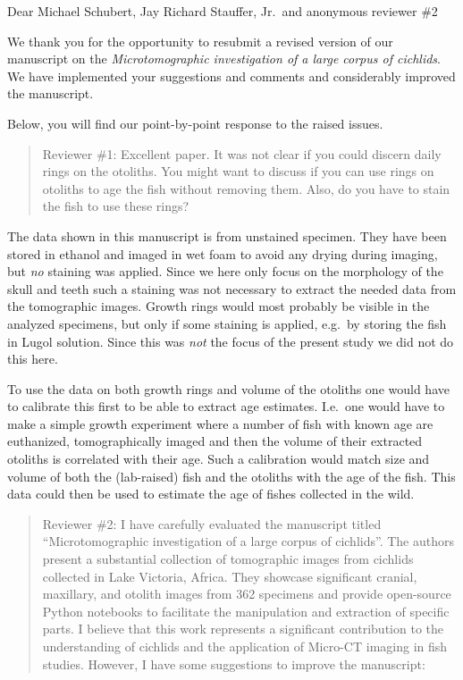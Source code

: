 \documentclass[color,english,personal]{ubletter}
\begin{document}
\begin{letter}{}
\subject{Submission of revised manuscript PONE-D-23-10896}

\opening{Dear Michael Schubert, Jay Richard Stauffer, Jr.\ and anonymous reviewer \#2}

We thank you for the opportunity to resubmit a revised version of our manuscript on the \emph{Microtomographic investigation of a large corpus of cichlids}.
We have implemented your suggestions and comments and considerably improved the manuscript.

Below, you will find our point-by-point response to the raised issues.

\begin{quote}
Reviewer \#1: Excellent paper. It was not clear if you could discern
daily rings on the otoliths. You might want to discuss if you can use
rings on otoliths to age the fish without removing them. Also, do you
have to stain the fish to use these rings?
\end{quote}

The data shown in this manuscript is from unstained specimen. They have
been stored in ethanol and imaged in wet foam to avoid any drying during
imaging, but \emph{no} staining was applied. Since we here only focus on
the morphology of the skull and teeth such a staining was not necessary
to extract the needed data from the tomographic images. Growth rings
would most probably be visible in the analyzed specimens, but only if
some staining is applied, e.g.~by storing the fish in Lugol solution.
Since this was \emph{not} the focus of the present study we did not do
this here.

To use the data on both growth rings and volume of the otoliths one
would have to calibrate this first to be able to extract age estimates.
I.e.\ one would have to make a simple growth experiment where a number of
fish with known age are euthanized, tomographically imaged and then the
volume of their extracted otoliths is correlated with their age. Such a
calibration would match size and volume of both the (lab-raised) fish
and the otoliths with the age of the fish. This data could then be used
to estimate the age of fishes collected in the wild.

\begin{quote}
Reviewer \#2: I have carefully evaluated the manuscript titled
``Microtomographic investigation of a large corpus of cichlids''. The
authors present a substantial collection of tomographic images from
cichlids collected in Lake Victoria, Africa. They showcase significant
cranial, maxillary, and otolith images from 362 specimens and provide
open-source Python notebooks to facilitate the manipulation and
extraction of specific parts. I believe that this work represents a
significant contribution to the understanding of cichlids and the
application of Micro-CT imaging in fish studies. However, I have some
suggestions to improve the manuscript:
\end{quote}


\end{letter}
\end{document}
